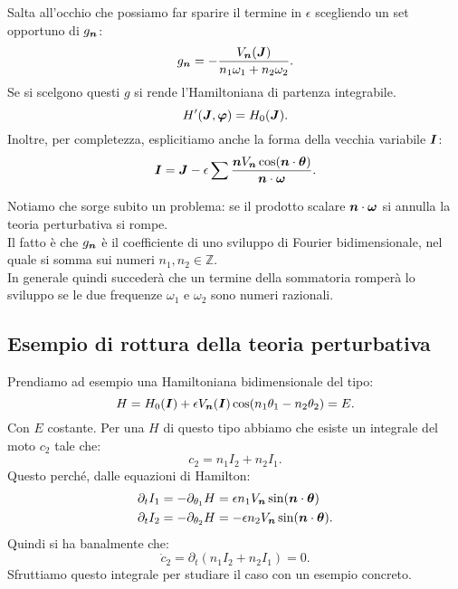 Salta all'occhio che possiamo far sparire il termine in $\epsilon$  scegliendo un set opportuno di $g_{\boldsymbol{n}}$:
\[
    g_{\boldsymbol{n}}= - \frac{V_{\boldsymbol{n}}(\boldsymbol{J})}{n_1\omega_1+n_2\omega_2}
.\] 
Se si scelgono questi $g$ si rende l'Hamiltoniana di partenza integrabile.
\[
    H'(\boldsymbol{J}, \boldsymbol{\varphi}) = H_0(\boldsymbol{J})
.\] 
Inoltre, per completezza, esplicitiamo anche la forma della vecchia variabile $\boldsymbol{I}$:
\[
    \boldsymbol{I}  = \boldsymbol{J}-\epsilon\sum_{}^{} \frac{\boldsymbol{n} V_{\boldsymbol{n}}\cos (\boldsymbol{n}\cdot \boldsymbol{\theta})}{\boldsymbol{n}\cdot \boldsymbol{\omega}}
.\] 
Notiamo che sorge subito un problema: se il prodotto scalare $\boldsymbol{n}\cdot \boldsymbol{\omega}$ si annulla la teoria perturbativa si rompe.\\
Il fatto è che $g_{\boldsymbol{n}}$ è il coefficiente di uno sviluppo di Fourier bidimensionale, nel quale si somma sui numeri $n_1,n_2 \in \mathbb{Z}$.\\
In generale quindi succederà che un termine della sommatoria romperà lo sviluppo se le due frequenze $\omega_1$ e $\omega_2$ sono numeri razionali.\\
\subsection{Esempio di rottura della teoria perturbativa}%
\label{sub:Esempio di rottura della teoria perturbativa}
Prendiamo ad esempio una Hamiltoniana bidimensionale del tipo:
\[
    H = H_0(\boldsymbol{I})+\epsilon V_{\boldsymbol{n}}(\boldsymbol{I})\cos (n_1\theta_1-n_2\theta_2)=E
.\] 
Con $E$ costante. Per una $H$ di questo tipo abbiamo che esiste un integrale del moto $c_2$ tale che:
\[
    c_2=n_1I_2+n_2I_1
.\] 
Questo perché, dalle equazioni di Hamilton:
\[\begin{aligned}
    & \partial_{t}I_1 = -\partial_{\theta_1}H = \epsilon n_1 V_{\boldsymbol{n}}\sin (\boldsymbol{n}\cdot \boldsymbol{\theta})\\
    & \partial_{t}I_2 = -\partial_{\theta_2}H = - \epsilon n_2 V_{\boldsymbol{n}}\sin (\boldsymbol{n}\cdot \boldsymbol{\theta})
.\end{aligned}\]
Quindi si ha banalmente che:
\[
    \dot{c}_2 = \partial_{t}(n_1I_2+n_2I_1) = 0
.\] 
Sfruttiamo questo integrale per studiare il caso con un esempio concreto.
